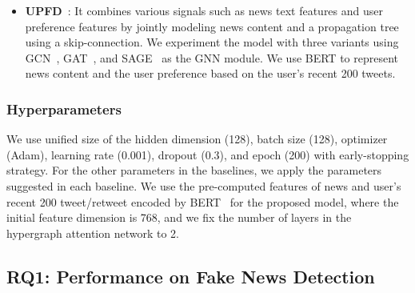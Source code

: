 \documentclass[conference]{IEEEtran}
\begin{document}
\begin{itemize}
     \item \textbf{UPFD}~\cite{dou2021user}: It combines various signals such as news text features and user preference features by jointly modeling news content and a propagation tree using a skip-connection. We experiment the model with three variants using GCN~\cite{kipf2016semi}, GAT~\cite{velivckovic2017graph}, and SAGE~\cite{hamilton2017inductive} as the GNN module. We use BERT to represent news content and the user preference based on the user's recent 200 tweets.
     







\end{itemize}

\subsubsection{Hyperparameters} We use unified size of the hidden dimension (128), batch size (128), optimizer (Adam), learning rate (0.001), dropout (0.3), and epoch (200) with early-stopping strategy. For the other parameters in the baselines, we apply the parameters suggested in each baseline. We use the pre-computed features of news and user's recent 200 tweet/retweet encoded by BERT~\cite{devlin2018bert} for the proposed model, where the initial feature dimension is 768, and we fix the number of layers in the hypergraph attention network to 2.


\subsection{RQ1: Performance on Fake News Detection}
\end{document}
